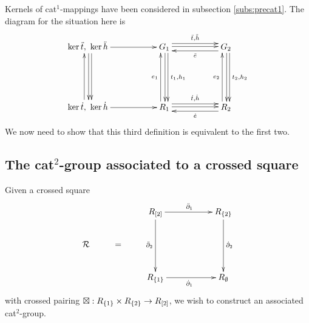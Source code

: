 Kernels of cat$^1$-mappings have been considered in 
subsection \ref{subs:precat1}. 
The diagram for the situation here is 
\begin{equation*} \label{eq:cat2cker}
\vcenter{\xymatrix{
   \ker\ddtt,\ \ker\ddhh \ar[rr] \ar[dd]<1.0ex> \ar[dd]<0.2ex> 
     && G_1 \ar[dd]<1.0ex>^{t_1,h_1} \ar[dd]<0.2ex> 
            \ar[rr]<1.0ex>^{\ddtt,\ddhh} \ar[rr]<0.2ex> 
          && G_2 \ar[dd]<1.0ex>^{t_2,h_2} \ar[dd]<0.2ex>  
             \ar[ll]<1.0ex>^{\ddee}  \\
     &&  \\
   \ker\dtt,\ \ker\dhh \ar[rr] \ar[uu]<1.0ex> 
     && R_1 \ar[uu]<1.0ex>^{e_1} \ar[rr]<1.0ex>^{\dtt,\dhh} \ar[rr]<0.2ex>
          && R_2 \ar[uu]<1.0ex>^{e_2} 
             \ar[ll]<1.0ex>^{\dee}
}}
\end{equation*}
\medskip
We now need to show that this third definition is equivalent to the first two. 


\newpage
\subsection{The cat$^2$-group associated to a crossed square} 
\label{sect:cat2-xsq}


Given a crossed square
\begin{equation} \label{eq:RsquareR}
\vcenter{\xymatrix{
        &   &    R_{[2]} \ar[rr]^{\ddbdyo} \ar[dd]_{\ddbdyt}
             &&  R_{\{2\}} \ar[dd]^{\dbdyt} \\
  \calR & = &&&  \\
        &   &    R_{\{1\}} \ar[rr]_{\dbdyo}
             &&  R_{\emptyset}
}}
\end{equation}
with crossed pairing $\boxtimes: R_{\{1\}} \times R_{\{2\}} \to R_{[2]}$, 
we wish to construct an associated cat$^2$-group.

